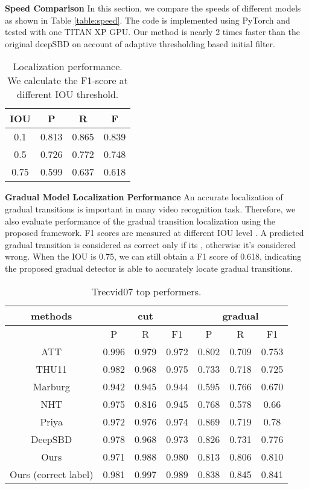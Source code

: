 \documentclass[runningheads]{llncs}
\begin{document}
\textbf{Speed Comparison}
In this section, we compare the speeds of different models as shown in Table \ref{table:speed}. The code is implemented using PyTorch and tested with one TITAN XP GPU. Our method is nearly 2 times faster than the original deepSBD on account of adaptive thresholding based initial filter.

\begin{table}
\centering
\begin{tabular} {c|c|c|c}
\hline IOU&P&R&F\\
\hline 0.1&0.813&0.865&0.839\\ 
\hline 0.5&0.726&0.772&0.748\\ 
\hline 0.75&0.599&0.637&0.618\\ 
\hline
\end{tabular}
\caption[localization]{Localization performance. We calculate the F1-score at different IOU threshold.}\label{table:3}
\end{table}
\vspace{-1em}
\textbf{Gradual Model Localization Performance} An accurate localization of gradual transitions is important in many video recognition task. Therefore, we also evaluate performance of the gradual transition localization using the proposed framework. F1 scores are measured at different IOU level . A predicted gradual transition is considered as correct only if its , otherwise it's considered wrong. When the IOU is 0.75, we can still obtain a F1 score of 0.618, indicating the proposed gradual detector is able to accurately locate gradual transitions.  

\begin{table}
\centering
\begin{tabular} {c|c|c|c|c|c|c}
\hline \multicolumn{1}{c|}{methods}&\multicolumn{3}{|c|}{cut}&\multicolumn{3}{|c}{gradual}\\
\hline &P&R&F1&P&R&F1\\
\hline ATT\cite{liu2007t}&0.996&0.979&0.972&0.802&0.709&0.753\\
\hline THU11\cite{yuan2007formal}&0.982&0.968&0.975&0.733&0.718&0.725\\
\hline Marburg\cite{muhling2007university}&0.942&0.945&0.944&0.595&0.766&0.670\\
\hline NHT\cite{kawai2007shot}&0.975&0.816&0.945&0.768&0.578&0.66\\
\hline Priya\cite{domnic2014walsh}&0.972&0.976&0.974&0.869&0.719&0.78\\
\hline DeepSBD\cite{hassanien2017large}&0.978&0.968&0.973&0.826&0.731&0.776\\
\hline Ours&0.971&0.988&0.980&0.813&0.806&0.810\\
\hline Ours (correct label)&0.981&0.997&0.989&0.838&0.845&0.841\\
\hline 
\end{tabular}
\caption[Trecvid comparison]{Trecvid07 top performers.}\label{table:4}
\end{table}
\vspace{-3em}
\end{document}
